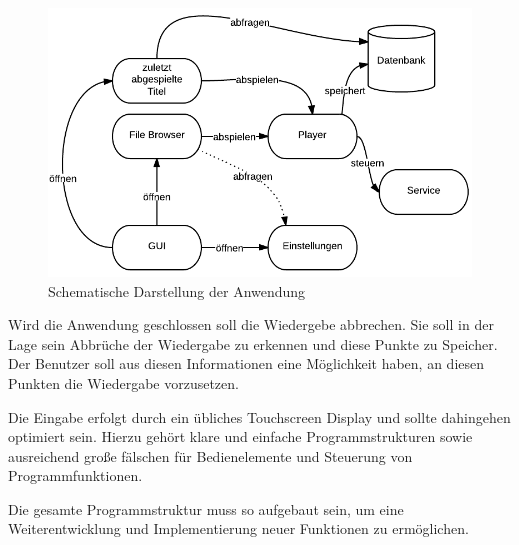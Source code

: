 \begin{figure}
\begin{center}
\includegraphics[scale=0.6]{images/konzept}
\caption{Schematische Darstellung der Anwendung}
\label{konzept}
\end{center}
\end{figure}

Wird die Anwendung geschlossen soll die Wiedergebe abbrechen. Sie soll in der Lage sein Abbrüche der Wiedergabe zu erkennen und diese Punkte zu Speicher. Der Benutzer soll aus diesen Informationen eine Möglichkeit haben, an diesen Punkten die Wiedergabe vorzusetzen.

Die Eingabe erfolgt durch ein übliches Touchscreen Display und sollte dahingehen optimiert sein. Hierzu gehört klare und einfache Programmstrukturen sowie ausreichend große fälschen für Bedienelemente und Steuerung von Programmfunktionen.

Die gesamte Programmstruktur muss so aufgebaut sein, um eine Weiterentwicklung und Implementierung neuer Funktionen zu ermöglichen.
